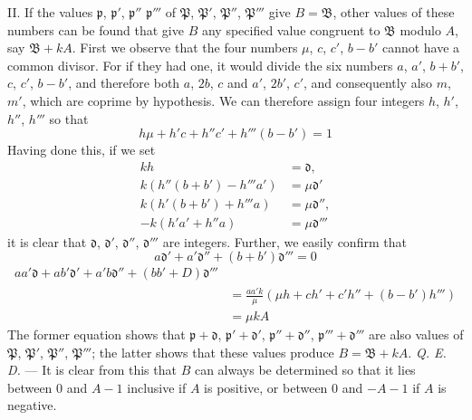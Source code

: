 II. If the values $\mathfrak{p}$, $\mathfrak{p}'$, $\mathfrak{p}''$ $\mathfrak{p}'''$ of $\mathfrak{P}$, $\mathfrak{P}'$, $\mathfrak{P}''$, $\mathfrak{P}'''$ give $B=\mathfrak{B}$, other values of these numbers can be found that give $B$ any specified value congruent to $\mathfrak{B}$ modulo $A$, say $\mathfrak{B}+kA$. First we observe that the four numbers $\mu$, $c$, $c'$, $b-b'$ cannot have a common divisor. For if they had one, it would divide the six numbers $a$, $a'$, $b+b'$, $c$, $c'$, $b-b'$, and therefore both $a$, $2b$, $c$ and $a'$, $2b'$, $c'$, and consequently also $m$, $m'$, which are coprime by hypothesis. We can therefore assign four integers $h$, $h'$, $h''$, $h'''$ so that
\[
h\mu+h'c+h''c'+h'''(b-b')=1
\]
Having done this, if we set
\[
\begin{aligned}
kh&=\mathfrak{d},\\k(h''(b+b')-h'''a')&=\mu\mathfrak{d}'\\
k(h'(b+b')+h'''a)&=\mu\mathfrak{d}'',\\-k(h'a'+h''a)&=\mu\mathfrak{d}'''
\end{aligned}
\]
it is clear that $\mathfrak{d}$, $\mathfrak{d}'$, $\mathfrak{d}''$, $\mathfrak{d}'''$ are integers. Further, we easily confirm that
\[
a\mathfrak{d}'+a'\mathfrak{d}''+(b+b')\mathfrak{d}'''=0
\]
\[
\begin{aligned}aa'\mathfrak{d}+ab'\mathfrak{d}'+a'b\mathfrak{d}''+(bb'+D)\mathfrak{d}'''\\&=\frac{aa'k}{\mu}(\mu h+ch'+c'h''+(b-b')h''')\\&=\mu kA\end{aligned}
\]
The former equation shows that $\mathfrak{p}+\mathfrak{d}$, $\mathfrak{p}'+\mathfrak{d}'$, $\mathfrak{p}''+\mathfrak{d}''$, $\mathfrak{p}'''+\mathfrak{d}'''$ are also values of $\mathfrak{P}$, $\mathfrak{P}'$, $\mathfrak{P}''$, $\mathfrak{P}'''$; the latter shows that these values produce $B=\mathfrak{B}+kA$. \textit{Q. E. D.} ---
It is clear from this that $B$ can always be determined so that it lies between $0$ and $A-1$ inclusive if $A$ is positive, or between $0$ and $-A-1$ if $A$ is negative.

